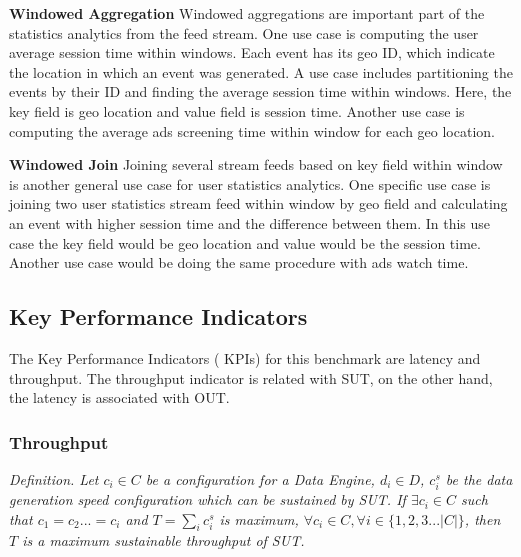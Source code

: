 \documentclass{vldb}
\begin{document}
\textbf{Windowed Aggregation}
Windowed aggregations are important part of the statistics analytics from the feed stream. One use case is computing the user average session time within windows. Each event has its geo ID, which indicate the location in which an event was generated. A use case includes partitioning the events by their ID and finding the average session time within windows. Here, the key field is geo location and value field is session time. Another use case is computing the average ads screening time within window for each geo location. 

\textbf{Windowed Join}
Joining several stream feeds based on key field within window is another general use case for user statistics analytics. One specific use case is joining two user statistics stream feed within window by geo field and calculating an event with higher session time and the difference between them. In this use case the key field would be geo location and value would be the session time. Another use case would be doing the same procedure with ads watch time. 


\subsection{Key Performance Indicators}
The Key Performance Indicators ( KPIs) for this benchmark are latency and throughput. The throughput indicator is related with SUT, on the other hand, the latency is associated with OUT. 


%


\subsubsection{Throughput}
\textit{Definition.  Let $c_{i} \in C$ be a configuration for a Data Engine, $d_{i} \in D$,  $c_{i}^{s}$ be the data generation speed configuration which can be sustained by SUT. If  $\exists c_{i} \in C$ such that $c_{1} = c_{2}... = c_{i}$ and  $T = \sum_{i}c_{i}^{s}$ is maximum, $\forall c_{i} \in C, \forall i \in \{1,2,3 ... |C|\}$, then $T$ is a maximum sustainable throughput of SUT.}
\end{document}
